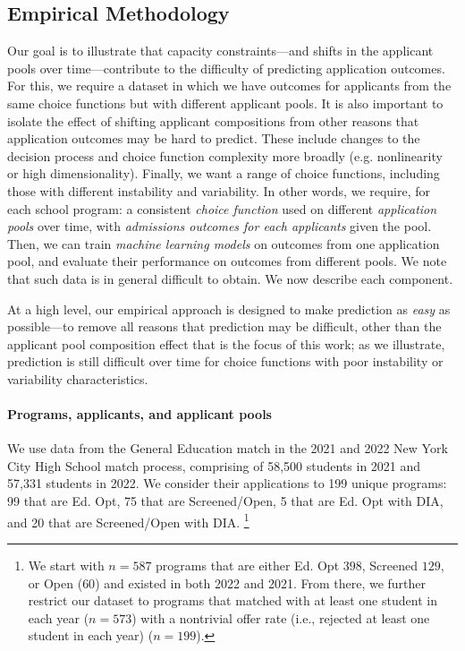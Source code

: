 \documentclass[letterpaper]{article}
\begin{document}
\subsection{Empirical Methodology}

Our goal is to illustrate that capacity constraints---and shifts in the applicant pools over time---contribute to the difficulty of predicting application outcomes. For this, we require a dataset in which we have outcomes for applicants from the same choice functions but with different applicant pools. It is also important to isolate the effect of shifting applicant compositions from other reasons that application outcomes may be hard to predict.
These include changes to the decision process and choice function complexity more broadly (e.g. nonlinearity or high dimensionality). Finally, we want a range of choice functions, including those  with different instability and variability. In other words, we require, for each school program: a consistent \textit{choice function} used on different \textit{application pools} over time, with \textit{admissions outcomes for each applicants} given the pool. Then, we can train \textit{machine learning models} on outcomes from one application pool, and evaluate their performance on outcomes from different pools. We note that such data is in general difficult to obtain. We now describe each component.

At a high level, our empirical approach is designed to make prediction as \textit{easy} as possible---to remove all reasons that prediction may be difficult, other than the applicant pool composition effect that is the focus of this work; as we illustrate, prediction is still difficult over time for choice functions with poor instability or variability characteristics.

\paragraph{Programs, applicants, and applicant pools}
We use data from the General Education match in the 2021 and 2022 New York City High School match process, comprising of 58,500 students in 2021 and 57,331 students in 2022. We consider their applications to 199 unique programs: 99 that are {Ed. Opt}, 75 that are {Screened/Open}, 5 that are {Ed. Opt with DIA}, and 20 that are {Screened/Open with DIA}.
\footnote{We start with $n=587$ programs that are either Ed. Opt $398$, Screened $129$, or Open ($60$) and existed in both 2022 and 2021. From there, we further restrict our dataset to programs that matched  with at least one student in each year ($n=573$) with a nontrivial offer rate (i.e., rejected at least one student in each year) ($n=199$).}
\end{document}
